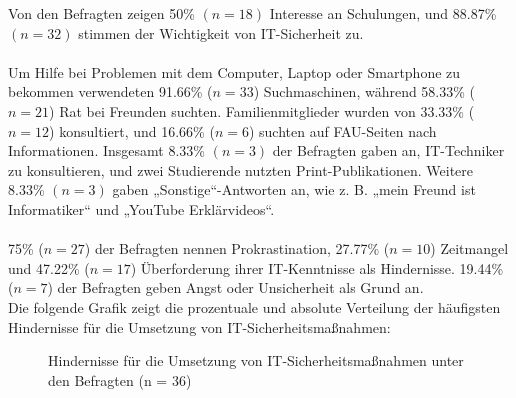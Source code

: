 \documentclass[german,report]{i1thesis}
\begin{document}
Von den Befragten zeigen 50\% \((n = 18)\) Interesse an Schulungen, und 88.87\% \((n = 32)\) stimmen der Wichtigkeit von IT-Sicherheit zu.\\
\\
Um Hilfe bei Problemen mit dem Computer, Laptop oder Smartphone zu bekommen verwendeten 91.66\% (\(n = 33\)) Suchmaschinen, während 58.33\% (\(n = 21\)) Rat bei Freunden suchten. Familienmitglieder wurden von 33.33\% (\(n = 12\)) konsultiert, und 16.66\% (\(n = 6\)) suchten auf FAU-Seiten nach Informationen. Insgesamt 8.33\% \((n = 3)\) der Befragten gaben an, IT-Techniker zu konsultieren, und zwei Studierende nutzten Print-Publikationen. Weitere 8.33\% \((n = 3)\) gaben „Sonstige“-Antworten an, wie z. B. „mein Freund ist Informatiker“ und „YouTube Erklärvideos“.\\
\\
75\% (\(n = 27\)) der Befragten nennen Prokrastination, 27.77\% (\(n = 10\)) Zeitmangel und 47.22\% (\(n = 17\)) Überforderung ihrer IT-Kenntnisse als Hindernisse. 19.44\% (\(n = 7\)) der Befragten geben Angst oder Unsicherheit als Grund an.
\\
Die folgende Grafik zeigt die prozentuale und absolute Verteilung der häufigsten Hindernisse für die Umsetzung von IT-Sicherheitsmaßnahmen:

\begin{figure}[H]
\centering
{}
\caption{Hindernisse für die Umsetzung von IT-Sicherheitsmaßnahmen unter den Befragten (n = 36)}
\label{fig:hindernisse_it_sicherheit_balken}
\end{figure}
\end{document}
